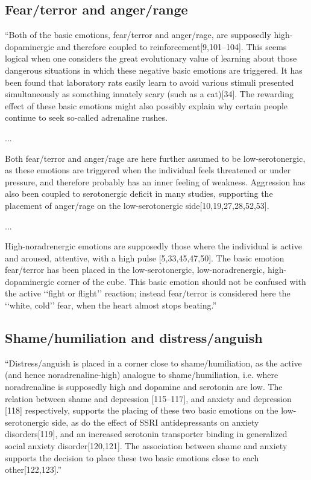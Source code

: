\subsection{Fear/terror and anger/range}

``Both of the basic emotions, fear/terror and anger/rage, are supposedly high-dopaminergic and therefore coupled to reinforcement[9,101–104]. This seems logical when one considers the great evolutionary value of learning about those dangerous situations in which these negative basic emotions are triggered. It has been found that laboratory rats easily learn to avoid various stimuli presented simultaneously as something innately scary (such as a cat)[34]. The rewarding effect of these basic emotions might also possibly explain why certain people continue to seek so-called adrenaline rushes. 

... 

Both fear/terror and anger/rage are here further assumed to be low-serotonergic, as these emotions are triggered when the individual feels threatened or under pressure, and therefore probably has an inner feeling of weakness. Aggression has also been coupled to serotonergic deficit in many studies, supporting the placement of anger/rage on the low-serotonergic side[10,19,27,28,52,53].

...

High-noradrenergic emotions are supposedly those where the individual is active and aroused, attentive, with a high pulse [5,33,45,47,50]. The basic emotion fear/terror has been placed in the low-serotonergic, low-noradrenergic, high-dopaminergic corner of the cube. This basic emotion should not be confused with the active ‘‘fight or flight’’ reaction; instead fear/terror is considered here the ‘‘white, cold’’ fear, when the heart almost stops beating.''

\subsection{Shame/humiliation and distress/anguish}

``Distress/anguish is placed in a corner close to shame/humiliation, as the active (and hence noradrenaline-high) analogue to shame/humiliation, i.e. where noradrenaline is supposedly high and dopamine and serotonin are low. The relation between shame and depression [115–117], and anxiety and depression [118] respectively, supports the placing of these two basic emotions on the low-serotonergic side, as do the effect of SSRI antidepressants on anxiety disorders[119], and an increased serotonin transporter binding in generalized social anxiety disorder[120,121]. The association between shame and anxiety supports the decision to place these two basic emotions close to each other[122,123].''

